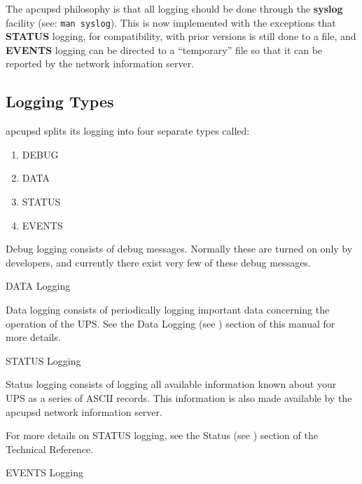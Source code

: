 {{{{{{{\label{index-Logging_002c-System-166}
\label{index-System-Logging-167}
The apcupsd philosophy is that all logging should be done through the {\bf
syslog} facility (see: {\tt man syslog}). This is now implemented with the
exceptions that {\bf STATUS} logging, for compatibility, with prior versions
is still done to a file, and {\bf EVENTS} logging can be directed to a
``temporary'' file so that it can be reported by the network information
server. 

\label{Logging-Types}

\subsection*{Logging Types}

\label{index-Logging_002c-types-168}
apcupsd splits its logging into four separate types called:  

\begin{enumerate}
\item DEBUG  
\item DATA  
\item STATUS  
\item EVENTS  
   \end{enumerate}

Debug logging consists of debug messages. Normally these are turned on only by
developers, and currently there exist very few of these debug messages. 

\small{DATA Logging}

Data logging consists of periodically logging important data concerning the
operation of the UPS. See the Data Logging (see 
) section of this manual for more
details. 

\small{STATUS Logging}

Status logging consists of logging all available information known about your
UPS as a series of ASCII records. This information is also made available by
the apcupsd network information server.  

For more details on STATUS logging, see the Status (see 
) section of
the Technical Reference. 

\small{EVENTS Logging}

}}}}}}}
